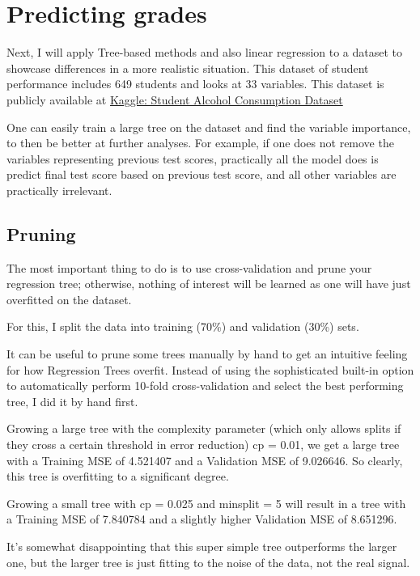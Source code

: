 \documentclass[12pt]{article}
\begin{document}
\section{Predicting grades}


Next, I will apply Tree-based methods and also linear regression to a dataset to showcase differences in a more realistic situation. This dataset of student performance includes 649 students and looks at 33 variables. This dataset is publicly available at \href{https://www.kaggle.com/datasets/uciml/student-alcohol-consumption}{Kaggle: Student Alcohol Consumption Dataset}


One can easily train a large tree on the dataset and find the variable importance, to then be better at further analyses. For example, if one does not remove the variables representing previous test scores, practically all the model does is predict final test score based on previous test score, and all other variables are practically irrelevant.


\subsection{Pruning}

The most important thing to do is to use cross-validation and prune your regression tree; otherwise, nothing of interest will be learned as one will have just overfitted on the dataset.

For this, I split the data into training (70\%) and validation (30\%) sets.

It can be useful to prune some trees manually by hand to get an intuitive feeling for how Regression Trees overfit. Instead of using the sophisticated built-in option to automatically perform 10-fold cross-validation and select the best performing tree, I did it by hand first.

Growing a large tree with the complexity parameter (which only allows splits if they cross a certain threshold in error reduction) cp = 0.01, we get a large tree with a Training MSE of 4.521407 and a Validation MSE of 9.026646. So clearly, this tree is overfitting to a significant degree.




Growing a small tree with cp = 0.025 and minsplit = 5 will result in a tree with a Training MSE of 7.840784 and a slightly higher Validation MSE of 8.651296.






It's somewhat disappointing that this super simple tree outperforms the larger one, but the larger tree is just fitting to the noise of the data, not the real signal.
\end{document}

